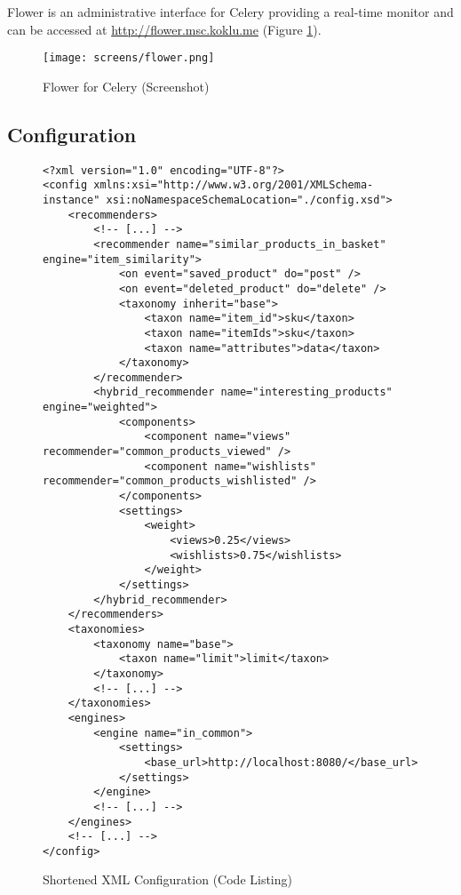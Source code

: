 Flower is an administrative interface for Celery providing a real-time monitor and can be accessed at \url{http://flower.msc.koklu.me} (Figure \ref{fig:implementation-framework-flower}).

\begin{figure}[ht]
    \texttt{[image: screens/flower.png]}
    \caption{Flower for Celery (Screenshot)}
    \label{fig:implementation-framework-flower}
\end{figure}

\subsection{Configuration}

\begin{figure}[ht!]
    \begin{verbatim}
<?xml version="1.0" encoding="UTF-8"?>
<config xmlns:xsi="http://www.w3.org/2001/XMLSchema-instance" xsi:noNamespaceSchemaLocation="./config.xsd">
    <recommenders>
        <!-- [...] -->
        <recommender name="similar_products_in_basket" engine="item_similarity">
            <on event="saved_product" do="post" />
            <on event="deleted_product" do="delete" />
            <taxonomy inherit="base">
                <taxon name="item_id">sku</taxon>
                <taxon name="itemIds">sku</taxon>
                <taxon name="attributes">data</taxon>
            </taxonomy>
        </recommender>
        <hybrid_recommender name="interesting_products" engine="weighted">
            <components>
                <component name="views" recommender="common_products_viewed" />
                <component name="wishlists" recommender="common_products_wishlisted" />
            </components>
            <settings>
                <weight>
                    <views>0.25</views>
                    <wishlists>0.75</wishlists>
                </weight>
            </settings>
        </hybrid_recommender>
    </recommenders>
    <taxonomies>
        <taxonomy name="base">
            <taxon name="limit">limit</taxon>
        </taxonomy>
        <!-- [...] -->
    </taxonomies>
    <engines>
        <engine name="in_common">
            <settings>
                <base_url>http://localhost:8080/</base_url>
            </settings>
        </engine>
        <!-- [...] -->
    </engines>
    <!-- [...] -->
</config>
    \end{verbatim}
    \caption{Shortened XML Configuration (Code Listing)}
    \label{fig:implementation-framework-configuration}
\end{figure}

